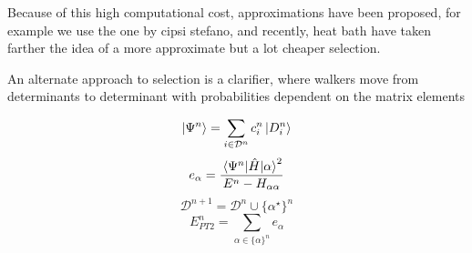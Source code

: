 \documentclass[./thesis.tex]{subfiles}
\begin{document}
Because of this high computational cost, approximations have been proposed, for example we use the one by \alert{cipsi stefano}, and recently, \alert{heat bath} have taken farther the idea of a more approximate but a lot cheaper selection.

An alternate approach to selection is \alert{a clarifier}, where walkers move from determinants to determinant with probabilities dependent on the matrix elements

\begin{equation}
\ket{\Psi^{n}} = \sum_{i \in \mathcal{D}^n} c_i^{n} \ket{D^n_i}
\end{equation}
\begin{equation}
e_\alpha = \frac{\mel{\Psi^n}{\hat{H}}{\alpha}^2}{E^n - H_{\alpha \alpha}}
\end{equation}
\begin{equation}
\mathcal{D}^{n+1} = \mathcal{D}^{n} \cup \{ \alpha^\star \}^n
\end{equation}
\begin{equation}
E_{PT2}^n = \sum_{\alpha \in \{\alpha \}^n} e_\alpha
\end{equation}
\end{document}
